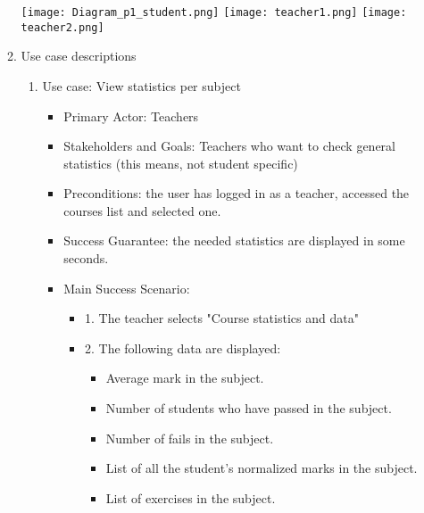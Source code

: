 \documentclass{article}
\begin{document}
\begin{enumerate}
\begin{enumerate}
		\texttt{[image: Diagram\_p1\_student.png]}
		\texttt{[image: teacher1.png]}
		\texttt{[image: teacher2.png]}
		\\
		\item{Use case descriptions}
		\begin{enumerate}
			\item{Use case: View statistics per subject}
			\begin{itemize}
				\item Primary Actor: Teachers
				\item Stakeholders and Goals: Teachers who want to check general statistics (this means, not student specific) 
				\item Preconditions: the user has logged in as a teacher, accessed the courses list and selected one.
				\item Success Guarantee: the needed statistics are displayed in some seconds.
				\item Main Success Scenario: 
					\begin{itemize}
					\item 1. The teacher selects "Course statistics and data"
					\item 2. The following data are displayed:
						\begin{itemize}
							\item Average mark in the subject.
							\item Number of students who have passed in the subject.
							\item Number of fails in the subject.
							\item List of all the student's normalized marks in the subject.
							\item List of exercises in the subject.
						\end{itemize}
				

\end{itemize}
\end{itemize}
\end{enumerate}
\end{enumerate}
\end{enumerate}
\end{document}
